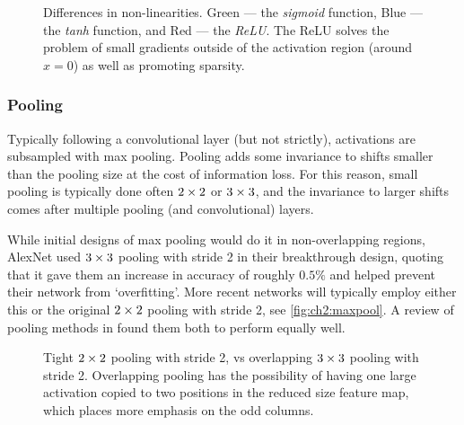   \begin{figure}
    \centering
      \caption[Differences in non-linearities]
              {Differences in non-linearities. Green --- the \emph{sigmoid} function, 
               Blue --- the \emph{tanh} function, and Red --- the \emph{ReLU}. The ReLU
               solves the problem of small gradients outside of the activation
               region (around $x=0$) as well as promoting sparsity.}\label{fig:ch2:nonlinearities}
  \end{figure}


\subsubsection{Pooling}
  Typically following a convolutional layer (but not strictly), activations are subsampled with
  max pooling. Pooling adds some invariance to shifts smaller than the pooling
  size at the cost of information loss. For this reason, small pooling is
  typically done often $2\times 2$ or $3\times 3$, and the invariance to larger shifts
  comes after multiple pooling (and convolutional) layers.
  
  While initial designs of max pooling would do it in non-overlapping regions, 
  AlexNet used $3\times 3$ pooling with stride 2 in their breakthrough design,
  quoting that it gave them an increase in accuracy of roughly $0.5\%$ and
  helped prevent their network from `overfitting'. More recent networks will
  typically employ either this or the original $2\times 2$ pooling with stride 2,
  see \autoref{fig:ch2:maxpool}. A review of pooling methods in
  \citep{mishkin_systematic_2016} found them both to perform equally well.
  
  \begin{figure}
    \centering
    \centering
    \caption[Tight vs.\ overlapping pooling]
            { Tight $2\times 2$ pooling with stride 2, vs
             overlapping $3\times 3$ pooling with
            stride 2. Overlapping pooling has the possibility of having one
            large activation copied to two positions in the reduced size
            feature map, which places more emphasis on the odd columns.}
    \label{fig:ch2:maxpool}
  \end{figure}

